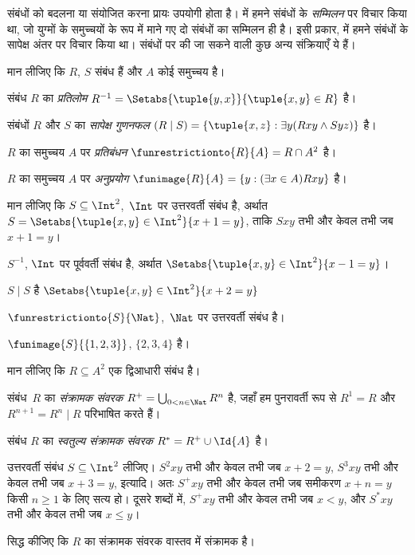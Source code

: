\documentclass[../../../include/open-logic-section]{subfiles}
\begin{document}

संबंधों को बदलना या संयोजित करना प्रायः उपयोगी होता है।
 में हमने संबंधों के
\emph{सम्मिलन} पर विचार किया था, जो युग्मों के समुच्चयों के रूप में माने गए
दो संबंधों का सम्मिलन ही है। इसी प्रकार,
 में हमने संबंधों के सापेक्ष अंतर
पर विचार किया था। संबंधों पर की जा सकने वाली कुछ अन्य संक्रियाएँ ये हैं।

\begin{defn} 
मान लीजिए कि $R$, $S$ संबंध हैं और $A$ कोई समुच्चय है।

संबंध $R$ का \emph{प्रतिलोम} $R^{-1} = \Setabs{\tuple{y, x}}{\tuple{x,
    y} \in R}$ है।

संबंधों $R$ और $S$ का \emph{सापेक्ष गुणनफल} $(R \mid S) =
\{\tuple{x, z} : \exists y(Rxy \land Syz)\}$ है।

$R$ का समुच्चय $A$ पर \emph{प्रतिबंधन} $\funrestrictionto{R}{A}= R
\cap A^2$ है।

$R$ का समुच्चय $A$ पर \emph{अनुप्रयोग} $\funimage{R}{A} = \{y :
(\exists x \in A)Rxy\}$ है।
\end{defn}

\begin{ex}
मान लीजिए कि $S \subseteq \Int^2$,~$\Int$ पर उत्तरवर्ती संबंध है, अर्थात
$S = \Setabs{\tuple{x, y} \in \Int^2}{x + 1 = y}$, ताकि $Sxy$ तभी और केवल तभी जब $x + 1 = y$।

$S^{-1}$, $\Int$ पर पूर्ववर्ती संबंध है, अर्थात
$\Setabs{\tuple{x,y}\in\Int^2}{x -1 =y}$।

$S\mid S$ है
$ \Setabs{\tuple{x,y}\in\Int^2}{x + 2 =y}$

$\funrestrictionto{S}{\Nat}$,~$\Nat$ पर उत्तरवर्ती संबंध है।

$\funimage{S}{\{1,2,3\}}$, $\{2, 3, 4\}$ है।
\end{ex}

\begin{defn}[संक्रामक संवरक]मान लीजिए कि $R \subseteq A^2$ एक द्विआधारी संबंध है।
	
संबंध~$R$ का \emph{संक्रामक संवरक} $R^+ = \bigcup_{0 < n \in
\Nat} R^n$ है, जहाँ हम पुनरावर्ती रूप से $R^1 = R$ और $R^{n+1} = R^n
\mid R$ परिभाषित करते हैं।

संबंध $R$ का \emph{स्वतुल्य संक्रामक संवरक} $R^* = R^+ \cup
\Id{A}$ है।
\end{defn}

\begin{ex}
उत्तरवर्ती संबंध $S \subseteq \Int^2$ लीजिए। $S^2xy$ तभी और केवल तभी जब $x + 2 =
y$, $S^3xy$ तभी और केवल तभी जब $x + 3 = y$, इत्यादि। अतः $S^+xy$ तभी और केवल तभी जब
समीकरण $x + n = y$ किसी
$n \geq 1$ के लिए सत्य हो। दूसरे शब्दों में, $S^+xy$ तभी और केवल तभी जब $x < y$, और $S^*xy$ तभी और केवल तभी जब $x \le
y$।
\end{ex}

\begin{prob}
सिद्ध कीजिए कि $R$ का संक्रामक संवरक वास्तव में संक्रामक है।
\end{prob}
\end{document}
